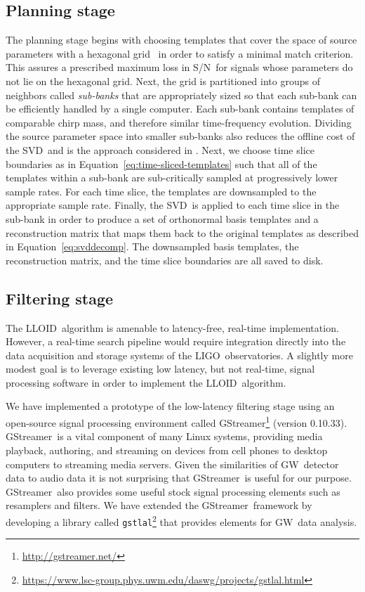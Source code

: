 \documentclass[preprint2]{aastex}
\newcommand{\GW}{GW}%
\newcommand{\LIGO}{LIGO}%
\newcommand{\SNR}{S/N}%
\newcommand{\SVD}{SVD}%
\newcommand{\gstlal}{{\tt gstlal}}
\newcommand{\gstreamer}{GStreamer}
\newcommand{\lloid}{LLOID}%
\begin{document}
\subsection{Planning stage}

The planning stage begins with choosing templates that cover the space of
source parameters with a hexagonal grid~\citep{PhysRevD.76.102004} in order to
satisfy a minimal match criterion.  This assures a prescribed maximum loss in
\SNR\ for signals whose parameters do not lie on the hexagonal grid.  Next, the
grid is partitioned into groups of neighbors called \emph{sub-banks} that
are appropriately sized so that each sub-bank can be efficiently handled by a
single computer.  Each sub-bank contains templates of comparable chirp mass, and
therefore similar time-frequency evolution.  Dividing the source
parameter space into smaller sub-banks also reduces the offline cost of the
\SVD\ and is the approach considered in \citet{Cannon:2010p10398}.  Next, we choose
time slice boundaries as in Equation~\eqref{eq:time-sliced-templates} such that all
of the templates within a sub-bank are sub-critically sampled at progressively lower
sample rates.  For each time slice, the templates are downsampled to the
appropriate sample rate.  Finally, the \SVD\ is applied to each time slice in
the sub-bank in order to produce a set of orthonormal basis templates and a
reconstruction matrix that maps them back to the original templates as
described in Equation~\eqref{eq:svddecomp}.  The downsampled basis templates,
the reconstruction matrix, and the time slice boundaries are all saved to disk.

\subsection{Filtering stage}

The \lloid\ algorithm is amenable to latency-free, real-time implementation.  However, a real-time search pipeline would require integration directly into the data acquisition and storage systems of the \LIGO\ observatories.  A slightly more 
modest goal is to leverage existing low latency, but not real-time, signal processing software in order to implement
the \lloid\ algorithm.

We have implemented a prototype of the low-latency filtering stage using an
open-source signal processing environment called
\gstreamer\footnote{\url{http://gstreamer.net/}} (version 0.10.33).
\gstreamer\ is a vital component of many Linux systems, providing media
playback, authoring, and streaming on devices from cell phones to desktop
computers to streaming media servers.  Given the similarities of
\GW\ detector data to audio data it is not surprising that
\gstreamer\ is useful for our purpose. \gstreamer\ also provides some useful
stock signal processing elements such as resamplers and filters.  We have
extended the \gstreamer\ framework by developing a library called
\gstlal\footnote{\url{https://www.lsc-group.phys.uwm.edu/daswg/projects/gstlal.html}}
that provides elements for \GW\ data analysis.
\end{document}
